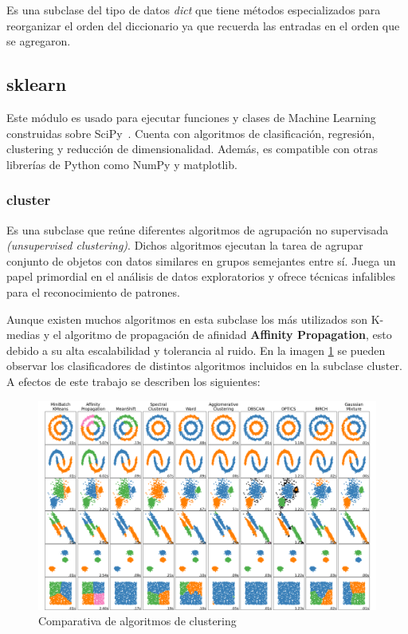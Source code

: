 \documentclass[a4paper, 12pt]{book}
\begin{document}
Es una subclase del tipo de datos \textit{dict} que tiene métodos especializados para reorganizar el orden del diccionario ya que recuerda las entradas en el orden que se agregaron.

\subsection{sklearn}
\label{sec:sklearn}

Este módulo es usado para ejecutar funciones y clases de Machine Learning construidas sobre SciPy~\cite{sklearnWeb}. Cuenta con algoritmos de clasificación, regresión, clustering y reducción de dimensionalidad. Además, es compatible con otras librerías de Python como NumPy y matplotlib.

\subsubsection{cluster}
\label{sec:sklearn_cluster}

Es una subclase que reúne diferentes algoritmos de agrupación no supervisada \textit{(unsupervised clustering)}. Dichos algoritmos ejecutan la tarea de agrupar conjunto de objetos con datos similares en grupos semejantes entre sí. Juega un papel primordial en el análisis de datos exploratorios y ofrece técnicas infalibles para el reconocimiento de patrones.

Aunque existen muchos algoritmos en esta subclase los más utilizados son K-medias y el algoritmo de propagación de afinidad \textbf{Affinity Propagation}, esto debido a su alta escalabilidad y tolerancia al ruido. En la imagen \ref{fig:comparativa_algoritmos} se pueden observar los clasificadores de distintos algoritmos incluidos en la subclase cluster. A efectos de este trabajo se describen los siguientes:

\begin{figure}[!htb]
    \centering
    \includegraphics[width=17cm, keepaspectratio]{img/algorithm_comparison.png}
    \caption{Comparativa de algoritmos de clustering}
    \label{fig:comparativa_algoritmos}
\end{figure}
\end{document}
